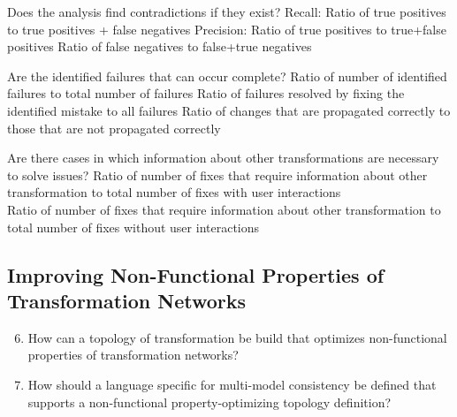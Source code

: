 {Does the analysis find contradictions if they exist?}
{Recall: Ratio of true positives to true positives + false negatives}
{Precision: Ratio of true positives to true+false positives}
{Ratio of false negatives to false+true negatives}

{Are the identified failures that can occur complete?}
{Ratio of number of identified failures to total number of failures}
{Ratio of failures resolved by fixing the identified mistake to all failures}
{Ratio of changes that are propagated correctly to those that are not propagated correctly}

{Are there cases in which information about other transformations are necessary to solve issues?}
{Ratio of number of fixes that require information about other transformation to total number of fixes with user interactions\\
Ratio of number of fixes that require information about other transformation to total number of fixes without user interactions}



\subsection*{Improving Non-Functional Properties of Transformation Networks}

\begin{enumerate}[label=\itshape RQ \arabic*.]
	\setcounter{enumi}{5}
	\item How can a topology of transformation be build that optimizes non-functional properties of transformation networks?
	\item How should a language specific for multi-model consistency be defined that supports a non-functional property-optimizing topology definition?
\end{enumerate}

